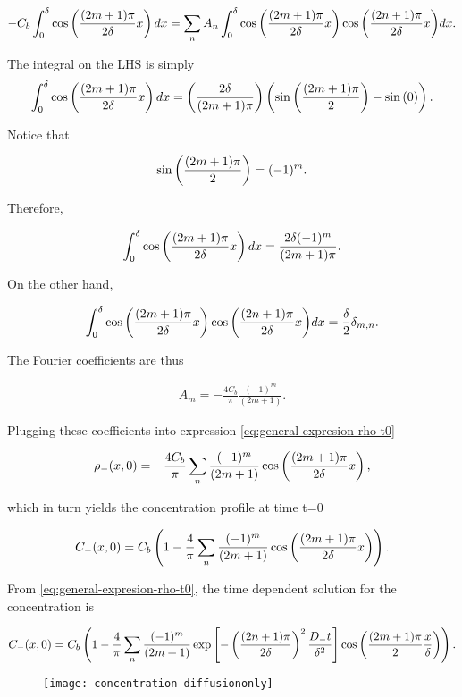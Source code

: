 \begin{align}
	-C_b\int_0^\delta \cos\left({\frac{(2m+1)\pi}{2\delta} x}\right) dx  = \sum_{n}A_n\int_0^\delta {\cos \left({\frac{(2m+1)\pi}{2\delta} x}\right) \cos \left({\frac{(2n+1)\pi}{2\delta}x}\right)  } dx.
\end{align}


The integral on the LHS is simply
\begin{align}
	\int_0^\delta \cos\left({\frac{(2m+1)\pi}{2\delta} x}\right) dx = \left({\frac{2\delta}{(2m+1)\pi}}\right)\left({\sin\left({\frac{(2m+1)\pi}{2}}\right)-\sin\left({0}\right)}\right).
\end{align}

Notice that

\begin{align}
	\sin\left({\frac{(2m+1)\pi}{2}}\right) = (-1)^m.
\end{align}


Therefore,

\begin{align}
	\int_0^\delta \cos\left({\frac{(2m+1)\pi}{2\delta} x}\right) dx = \frac{2\delta(-1)^m}{(2m+1)\pi}.
\end{align}

On the other hand, 

\begin{align}
	\int_0^\delta {\cos \left({\frac{(2m+1)\pi}{2\delta} x}\right) \cos \left({\frac{(2n+1)\pi}{2\delta}x}\right)  } dx = \frac{\delta}{2}\delta_{m,n}.
\end{align}

The Fourier coefficients are thus

\begin{align}
	A_m = -\frac{4C_b}{\pi}\frac{(-1)^m}{(2m+1)}.
\end{align}


Plugging these coefficients into expression \ref{eq:general-expresion-rho-t0}

\begin{align}
	\rho_-(x,0) = -\frac{4C_b}{\pi} \sum_n \frac{(-1)^m}{(2m+1)}\cos\left({\frac{(2m+1)\pi}{2\delta} x}\right),
\end{align}

which in turn yields the concentration profile at time t=0

\begin{align}
	C_-(x,0) = C_b\left({1-\frac{4}{\pi} \sum_n \frac{(-1)^m}{(2m+1)}\cos\left({\frac{(2m+1)\pi}{2\delta} x}\right)}\right).
\end{align}


From \ref{eq:general-expresion-rho-t0}, the time dependent solution for the concentration is

\begin{align}
	C_-(x,0) = C_b\left({1-\frac{4}{\pi} \sum_n \frac{(-1)^m}{(2m+1)}\exp\left[{-\left({\frac{(2n+1)\pi}{2\delta}}\right)^2\frac{D_- t}{\delta^2}}\right]\cos\left({\frac{(2m+1)\pi}{2} \frac{x}{\delta}}\right)}\right).
	\label{eq:solution-diffusion}
\end{align}


\begin{figure}[htbp]
\centering
\texttt{[image: concentration-diffusiononly]}
\caption{}
\label{fig:sub1}
\end{figure}

